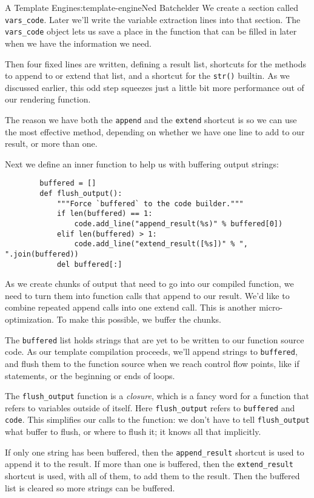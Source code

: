 \begin{aosachapter}{A Template Engine}{s:template-engine}{Ned Batchelder}
We create a section called \texttt{vars\_code}. Later we'll write the
variable extraction lines into that section. The \texttt{vars\_code}
object lets us save a place in the function that can be filled in later
when we have the information we need.

Then four fixed lines are written, defining a result list, shortcuts for
the methods to append to or extend that list, and a shortcut for the
\texttt{str()} builtin. As we discussed earlier, this odd step squeezes
just a little bit more performance out of our rendering function.

The reason we have both the \texttt{append} and the \texttt{extend}
shortcut is so we can use the most effective method, depending on
whether we have one line to add to our result, or more than one.

Next we define an inner function to help us with buffering output
strings:

\begin{verbatim}
        buffered = []
        def flush_output():
            """Force `buffered` to the code builder."""
            if len(buffered) == 1:
                code.add_line("append_result(%s)" % buffered[0])
            elif len(buffered) > 1:
                code.add_line("extend_result([%s])" % ", ".join(buffered))
            del buffered[:]
\end{verbatim}

As we create chunks of output that need to go into our compiled
function, we need to turn them into function calls that append to our
result. We'd like to combine repeated append calls into one extend call.
This is another micro-optimization. To make this possible, we buffer the
chunks.

The \texttt{buffered} list holds strings that are yet to be written to
our function source code. As our template compilation proceeds, we'll
append strings to \texttt{buffered}, and flush them to the function
source when we reach control flow points, like if statements, or the
beginning or ends of loops.

The \texttt{flush\_output} function is a \emph{closure}, which is a
fancy word for a function that refers to variables outside of itself.
Here \texttt{flush\_output} refers to \texttt{buffered} and
\texttt{code}. This simplifies our calls to the function: we don't have
to tell \texttt{flush\_output} what buffer to flush, or where to flush
it; it knows all that implicitly.

If only one string has been buffered, then the \texttt{append\_result}
shortcut is used to append it to the result. If more than one is
buffered, then the \texttt{extend\_result} shortcut is used, with all of
them, to add them to the result. Then the buffered list is cleared so
more strings can be buffered.


\end{aosachapter}
